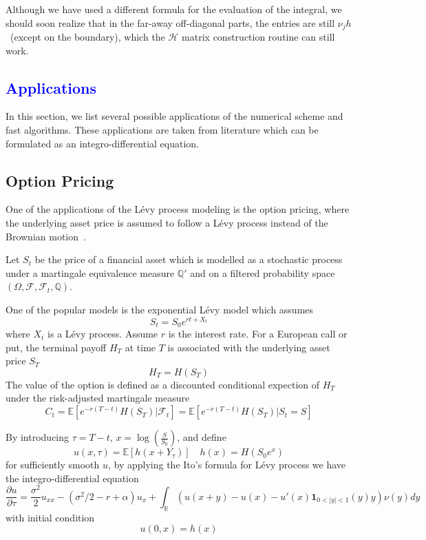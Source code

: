 \documentclass[3p,,preprint,12pt]{elsarticle}
\newcommand{\RR}[0]{\mathbb{R}}
\newcommand{\lib}[1]{\textcolor{blue}{\section{#1}}}
\theoremstyle{definition}
\begin{document}
Although we have used a different formula for the evaluation of the integral, we should soon realize that in the far-away off-diagonal parts, the entries are still $\nu_j h$~(except on the boundary), which the $\mathcal{H}$ matrix construction routine can still work. 

\lib{Applications}

In this section, we list several possible applications of the numerical scheme and fast algorithms. These applications are taken from literature which can be formulated as an integro-differential equation.

\subsection{Option Pricing}

One of the applications of the L\'evy process modeling is the option pricing, where the underlying asset price is assumed to follow a L\'evy process instead of the Brownian motion~\cite{tankov2009jump,kou2002jump}.

Let $S_t$ be the price of a financial asset which is modelled as a stochastic process under a martingale equivalence measure $\mathbb{Q}'$ and on a filtered probability space $(\Omega, \mathcal{F}, \mathcal{F}_t, \mathbb{Q})$.

One of the popular models is the exponential L\'evy model which assumes
\begin{equation}
	S_t = S_0 e^{rt+X_t}
\end{equation}
where $X_t$ is a L\'evy process. Assume $r$ is the interest rate. For a European call or put, the terminal payoff $H_T$ at time $T$ is associated with the underlying asset price $S_T$
\begin{equation}
	H_T = H(S_T)
\end{equation}
 The value of the option is defined as a discounted conditional expection of $H_T$ under the risk-adjusted martingale measure
\begin{equation}
	C_t = \mathbb{E}[e^{-r(T-t)}H(S_T)|\mathcal{F}_t] = \mathbb{E}[e^{-r(T-t)}H(S_T)|S_t=S]
\end{equation}

By introducing $\tau = T-t$, $x=\log\left( \frac{S}{S_0} \right)$, and define
\begin{equation}
	u(x,\tau) = \mathbb{E}[h(x+Y_\tau)]\quad h(x) = H(S_0 e^x)
\end{equation}
 for sufficiently smooth $u$, by applying the Ito's formula for L\'evy process we have the integro-differential equation
\begin{equation}
	\frac{\partial u}{\partial \tau} = \frac{\sigma^2}{2}u_{xx} - (\sigma^2/2-r+\alpha) u_x + \int_\RR (u(x+y)-u(x)-u'(x)\mathbf{1}_{0<|y|<1}(y)y)\nu(y)dy
\end{equation}
with initial condition
\begin{equation}
	u(0,x) = h(x)
\end{equation}
\end{document}
